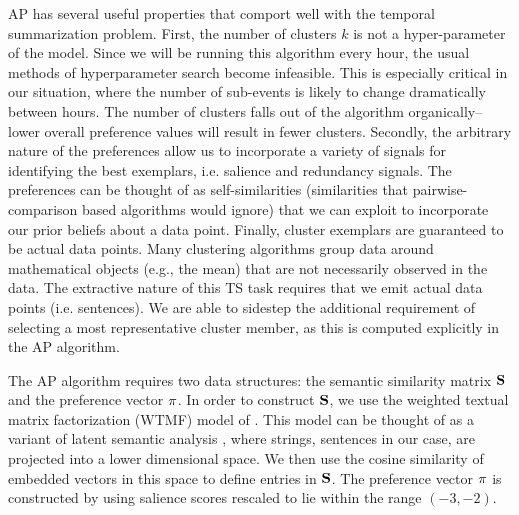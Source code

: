AP has several useful properties that comport well with the temporal summarization problem. First, the number of clusters $k$ is not a hyper-parameter of the model. Since we will be running this algorithm every hour, the usual methods of hyperparameter search become infeasible.  This is especially critical in our situation, where the number of sub-events is likely to change dramatically between hours. The number of clusters falls out of the algorithm organically--lower overall preference values will result in fewer clusters. Secondly, the arbitrary nature of the preferences allow us to incorporate a variety of signals for identifying the best exemplars, i.e. salience and redundancy signals.  The preferences can be thought of as self-similarities (similarities that pairwise-comparison based algorithms would ignore) that we can exploit to  incorporate our prior beliefs about a data point.  Finally, cluster exemplars are guaranteed to be actual data points. Many  clustering algorithms group data around mathematical objects (e.g., the mean) that are not necessarily observed in the data. The extractive nature of this TS task requires that we emit actual data points (i.e. sentences). We are able to sidestep  the additional requirement of selecting a most representative cluster member, as this is computed explicitly in the AP  algorithm. 



%

The AP algorithm requires two data structures: the semantic similarity matrix $\mathbf{S}$ and the preference vector $\mathbf{\pi}$.  In order to construct $\mathbf{S}$, we use the weighted textual matrix factorization (WTMF) model of \cite{guo2012simple}. This  model can be thought of as a variant of latent semantic analysis \cite{deerwester:lsa},  where strings, sentences in our case, are projected into a lower dimensional space.  We then use the cosine similarity of embedded vectors in this space to define entries in $\mathbf{S}$.  The preference vector $\mathbf{\pi}$ is constructed by using salience scores rescaled to lie within the  range $(-3, -2)$.  




